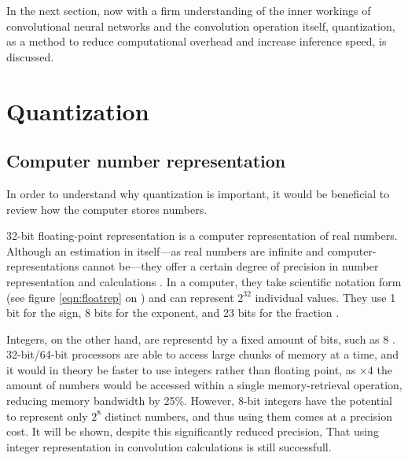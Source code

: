 \label{fig:mm}

In the next section, now with a firm understanding of the inner workings of convolutional neural networks and the convolution operation itself, quantization, as a method to reduce computational overhead and increase inference speed, is discussed.

\section{Quantization}
\subsection{Computer number representation}
In order to understand why quantization is important, it would be beneficial to review how the computer stores numbers.

32-bit floating-point representation is a computer representation of real numbers. Although an estimation in itself---as real numbers are infinite and computer-representations cannot be---they offer a certain degree of precision in number representation and calculations \cite{ieee}. In a computer, they take scientific notation form (see figure \ref{eqn:floatrep} on \pageref{eqn:floatrep}) and can represent $2^{32}$ individual values. They use 1 bit for the sign, 8 bits for the exponent, and 23 bits for the fraction \cite{ieee}.

\label{eqn:floatrep}

Integers, on the other hand, are representd by a fixed amount of bits, such as 8 \cite{ieee}. 32-bit/64-bit processors are able to access large chunks of memory at a time, and it would in theory be faster to use integers rather than floating point, as $\times4$ the amount of numbers would be accessed within a single memory-retrieval operation, reducing memory bandwidth by 25\%. However, 8-bit integers have the potential to represent only $2^{8}$ distinct numbers, and thus using them comes at a precision cost. It will be shown, despite this significantly reduced precision, That using integer representation in convolution calculations is still successfull.

